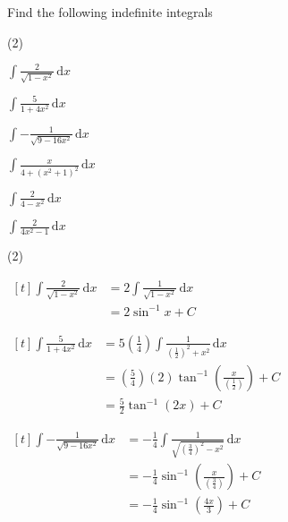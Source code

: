 \documentclass[11pt,a4paper]{book}
\begin{document}
\begin{example}

Find the following indefinite integrals

\begin{tasks}[label=(\alph*),label-width=3.5ex](2)

\task ${\displaystyle \int\frac{2}{\sqrt{1-x^{2}}}\, \mathrm{d}x}$

\task ${\displaystyle \int\frac{5}{1+4x^{2}}\, \mathrm{d}x}$

\task  ${\displaystyle \int-\frac{1}{\sqrt{9-16x^{2}}}\, \mathrm{d}x}$

\task  ${\displaystyle \int\frac{x}{4+(x^{2}+1)^{2}}\, \mathrm{d}x}$

\task ${\displaystyle \int\frac{2}{4-x^{2}}\, \mathrm{d}x}$

\task ${\displaystyle \int\frac{2}{4x^{2}-1}\, \mathrm{d}x}$

\end{tasks}

\Solution

\begin{tasks}[label=(\alph*),label-width=3.5ex,after-item-skip = .3cm](2)

\task
$
\begin{aligned}[t]
{\displaystyle \int\frac{2}{\sqrt{1-x^{2}}}\, \mathrm{d}x} & =2\int\frac{1}{\sqrt{1-x^{2}}}\, \mathrm{d}x\\
 & =2\sin^{-1}x+C
\end{aligned}
$

\task
$
\begin{aligned}[t]
{\displaystyle \int\frac{5}{1+4x^{2}}\, \mathrm{d}x} & =5\left(\frac{1}{4}\right)\int\frac{1}{\left(\frac{1}{2}\right)^{2}+x^{2}}\, \mathrm{d}x\\
 & =\left(\frac{5}{4}\right)\left(2\right)\tan^{-1}\left(\frac{x}{\left(\frac{1}{2}\right)}\right)+C\\
 & =\frac{5}{2}\tan^{-1}(2x)+C
\end{aligned}
$

\task
$
\begin{aligned}[t]
{\displaystyle \int-\frac{1}{\sqrt{9-16x^{2}}}\, \mathrm{d}x} & ={\displaystyle -\frac{1}{4}\int\frac{1}{\sqrt{\left(\frac{3}{4}\right)^{2}-x^{2}}}\, \mathrm{d}x}\\
 & =-\frac{1}{4}\sin^{-1}\left(\frac{x}{\left(\frac{3}{4}\right)}\right)+C\\
 & =-\frac{1}{4}\sin^{-1}\left(\frac{4x}{3}\right)+C
\end{aligned}
$


\end{tasks}
\end{example}
\end{document}
